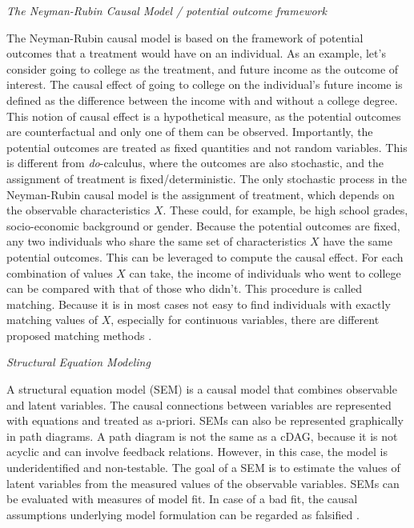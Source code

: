 \documentclass[nobib]{tufte-handout}
\newcommand{\docalc}{\emph{do}-calculus\xspace}
\begin{document}
\begin{InfoBox}
\centering
\colorbox{mygray}{
  \centering
  \begin{minipage}{1\textwidth}
    \medskip

    \emph{The Neyman-Rubin Causal Model / potential outcome framework}
    \medskip

    The Neyman-Rubin causal model is based on the framework of potential outcomes that a treatment would have on an individual.
    As an example, let's consider going to college as the treatment, and future income as the outcome of interest.
    The causal effect of going to college on the individual's future income is defined as the difference between the income with and without a college degree.
    This notion of causal effect is a hypothetical measure, as the potential outcomes are counterfactual and only one of them can be observed.
    Importantly, the potential outcomes are treated as fixed quantities and not random variables.
    This is different from \docalc, where the outcomes are also stochastic, and the assignment of treatment is fixed/deterministic.
    The only stochastic process in the Neyman-Rubin causal model is the assignment of treatment, which depends on the observable characteristics $X$.
    These could, for example, be high school grades, socio-economic background or gender.
    Because the potential outcomes are fixed, any two individuals who share the same set of characteristics $X$ have the same potential outcomes.
    This can be leveraged to compute the causal effect.
    For each combination of values $X$ can take, the income of individuals who went to college can be compared with that of those who didn't.
    This procedure is called matching.
    Because it is in most cases not easy to find individuals with exactly matching values of $X$, especially for continuous variables, there are different proposed matching methods \citep{sekhon2008neyman}.

    \medskip

    \emph{Structural Equation Modeling}
    \medskip

    A structural equation model (SEM) is a causal model that combines observable and latent variables.
    The causal connections between variables are represented with equations and treated as a-priori.
    SEMs can also be represented graphically in path diagrams.
    A path diagram is not the same as a cDAG, because it is not acyclic and can involve feedback relations. However, in this case, the model is underidentified and non-testable.
    The goal of a SEM is to estimate the values of latent variables from the measured values of the observable variables.
    SEMs can be evaluated with measures of model fit.
    In case of a bad fit, the causal assumptions underlying model formulation can be regarded as falsified \citep{bollen2013eight}.


\end{minipage}}
\end{InfoBox}
\end{document}
